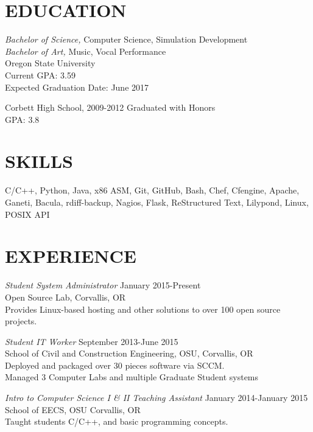 \documentclass[line,margin]{res}
\begin{document}
\address{(503)-758-6952, fahlmantaylor@gmail.com, tfahl.com}
\address{github.com/fahlmant, linkedin.com/in/taylorfahlman}
\begin{resume}


\section{EDUCATION}
                    {\sl Bachelor of Science,} Computer Science, Simulation Development \\
                    {\sl Bachelor of Art,} Music, Vocal Performance \\
                    Oregon State University\\
                    Current GPA: 3.59\\
                    Expected Graduation Date: June 2017 
                    
                    Corbett High School, 2009-2012
                    Graduated with Honors\\
                    GPA: 3.8
\section{SKILLS}
                    C/C++, Python, Java, x86 ASM, Git, GitHub, Bash, Chef, Cfengine, Apache, Ganeti, Bacula, rdiff-backup,
                    Nagios, Flask, ReStructured Text, Lilypond, Linux, POSIX API
\section{EXPERIENCE}
                    {\sl Student System Administrator} \hfill January 2015-Present \\
                    Open Source Lab, 
                    Corvallis, OR\\
                    Provides Linux-based hosting and other solutions to over 100 open source projects.

                    {\sl Student IT Worker} \hfill September 2013-June 2015 \\
                    School of Civil and Construction Engineering, OSU, 
                    Corvallis, OR\\ 
                    Deployed and packaged over 30 pieces software via SCCM.\\
                    Managed 3 Computer Labs and multiple Graduate Student systems

                    {\sl Intro to Computer Science I \& II Teaching Assistant} \hfill January 2014-January 2015\\
                    School of EECS, OSU
                    Corvallis, OR\\
                    Taught students C/C++, and basic programming concepts.
                    

\end{resume}
\end{document}
